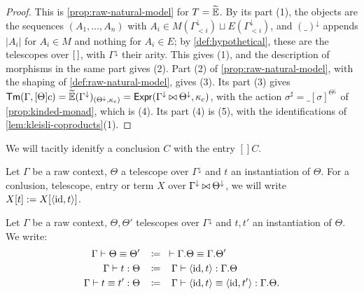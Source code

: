\begin{proof}
    This is \cref{prop:raw-natural-model} for $T = \widetilde{\mathbb{E}}$. By its part (1), the objects are the sequences $(A_1, \ldots, A_n)$ with $A_i \in M(\Gamma_{<i}^{\downarrow}) \sqcup E(\Gamma_{<i}^{\downarrow})$, and $(\_)^{\downarrow}$ appends $|A_i|$ for $A_i \in M$ and nothing for $A_i \in E$; by \cref{def:hypothetical}, these are the telescopes over $\left[\,\right]$, with $\Gamma^{\downarrow}$ their arity. This gives (1), and the description of morphisms in the same part gives (2). Part (2) of \cref{prop:raw-natural-model}, with the shaping of \cref{def:raw-natural-model}, gives (3). Its part (3) gives $\mathsf{Tm}(\Gamma, [\Theta]c) = \widetilde{\mathbb{E}}(\Gamma^{\downarrow})_{(\Theta^{\downarrow}, \kappa_c)} = \mathsf{Expr}(\Gamma^{\downarrow} \mathbin{\bowtie} \Theta^{\downarrow}, \kappa_c)$, with the action $\sigma^\sharp = \_[\sigma]^{\Theta^{\downarrow}}$ of \cref{prop:kinded-monad}, which is (4). Its part (4) is (5), with the identifications of \cref{lem:kleisli-coproducts}(1).
\end{proof}

\begin{notation}
    We will tacitly idenitfy a conclusion $C$ with the entry $[]C$. 
\end{notation}

\begin{notation}
    Let $\Gamma$ be a raw context, $\Theta$ a telescope over $\Gamma^{\downarrow}$ and $t$ an instantiation of $\Theta$. For a conlusion, telescope, entry or term $X$ over $\Gamma^{\downarrow} \mathbin{\bowtie} \Theta^{\downarrow}$, we will write $X[t] := X[\langle \mathrm{id}, t \rangle]$.
\end{notation}

\begin{notation}
    Let $\Gamma$ be a raw context, $\Theta, \Theta'$ telescopes over $\Gamma^{\downarrow}$ and $t, t'$ an instantiation of $\Theta$. We write:
    \begin{align*}
        \Gamma \vdash \Theta \equiv \Theta' \;\;\; &\coloneqq \;\;\; \vdash \Gamma.\Theta \equiv \Gamma.\Theta'\\
        \Gamma \vdash t : \Theta \;\;\; &\coloneqq \;\;\; \Gamma \vdash \langle \mathrm{id}, t \rangle : \Gamma.\Theta\\
        \Gamma \vdash t \equiv t' : \Theta \;\;\; &\coloneqq \;\;\; \Gamma \vdash \langle \mathrm{id}, t \rangle \equiv \langle \mathrm{id}, t' \rangle : \Gamma.\Theta.
    \end{align*}
\end{notation}

